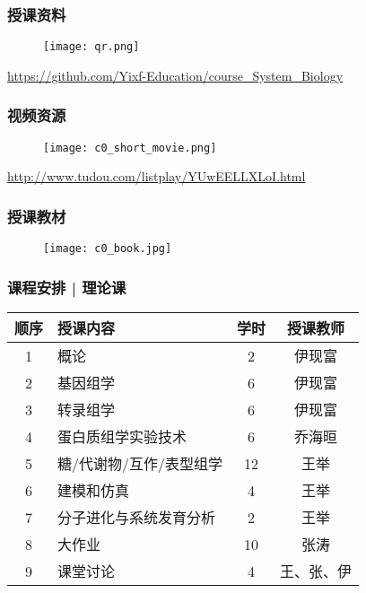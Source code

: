\begin{frame}
\end{frame}

\begin{frame}
  \frametitle{授课资料}
  \begin{figure}
    \centering
    \texttt{[image: qr.png]}
  \end{figure}
  \begin{center}
  \href{https://github.com/Yixf-Education/course_System_Biology}{https://github.com/Yixf-Education/course\_System\_Biology}
  \end{center}
\end{frame}

\begin{frame}
  \frametitle{视频资源}
  \begin{figure}
    \centering
    \texttt{[image: c0\_short\_movie.png]}
  \end{figure}
  \begin{center}
    \href{http://www.tudou.com/listplay/YUwEELLXLoI.html}{http://www.tudou.com/listplay/YUwEELLXLoI.html}
  \end{center}
\end{frame}

\begin{frame}
  \frametitle{授课教材}
  \begin{figure}
    \centering
    \texttt{[image: c0\_book.jpg]}
  \end{figure}
\end{frame}

\begin{frame}
  \frametitle{课程安排 | 理论课}
  \begin{table}
    \centering
    \begin{tabular}{clcc}
      \hline
      \rowcolor{blue!50}顺序 & 授课内容 & 学时 & 授课教师\\
      \hline
      1 & 概论 & 2 & 伊现富\\
      2 & 基因组学 & 6 & 伊现富\\
      3 & 转录组学 & 6 & 伊现富\\
      4 & 蛋白质组学实验技术 & 6 & 乔海晅\\
      5 & 糖/代谢物/互作/表型组学 & 12 & 王举\\
      6 & 建模和仿真 & 4 & 王举\\
      7 & 分子进化与系统发育分析 & 2 & 王举\\
      8 & 大作业 & 10 & 张涛\\
      9 & 课堂讨论 & 4 & 王、张、伊\\
      \hline
    \end{tabular}
  \end{table}
\end{frame}

